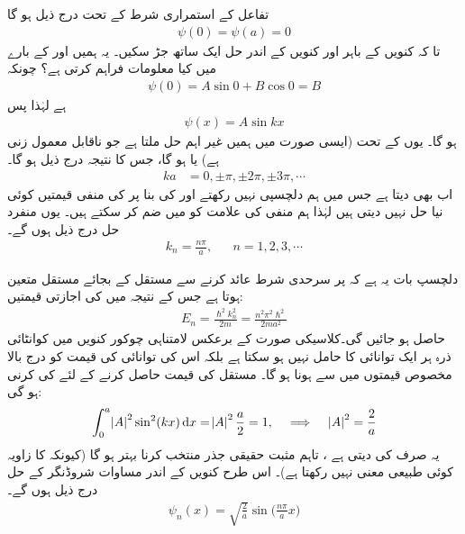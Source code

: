 تفاعل  کے استمراری شرط کے تحت  درج ذیل ہو گا
\begin{align}
\psi(0)=\psi(a)=0
\end{align} 
تا کہ کنویں کے باہر اور کنویں کے اندر حل ایک  ساتھ جڑ سکیں۔ یہ ہمیں اور کے بارے میں کیا معلومات فراہم کرتی ہے؟ چونکہ
\begin{align*}
\psi(0)=A\sin 0+B\cos 0=B
\end{align*}
ہے لہٰذا   پس
\begin{align}
\psi(x)=A\sin kx
\end{align}
ہو گا۔ یوں  کے تحت     (ایسی صورت میں ہمیں غیر اہم حل  ملتا ہے جو ناقابل  معمول زنی  ہے) یا  ہو گا، جس کا نتیجہ   درج ذیل ہو گا۔
\begin{align}
ka&=0,\pm\pi,\pm2\pi,\pm3\pi,\cdots
\end{align} 
اب  بھی  دیتا ہے جس  میں ہم دلچسپی نہیں رکھتے اور  کی بنا پر  کی منفی قیمتیں کوئی نیا حل نہیں دیتی ہیں لہٰذا ہم منفی کی علامت کو  میں ضم کر سکتے ہیں۔ یوں منفرد حل درج ذیل ہوں گے۔ 
\begin{align}
k_{n}=\frac{n\pi}{a},&& n=1,2,3,\cdots
\end{align}

دلچسپ بات یہ ہے کہ  پر سرحدی شرط عائد کرنے سے  مستقل  کے بجائے مستقل متعین ہوتا ہے جس کے نتیجہ میں    کی اجازتی قیمتیں:
\begin{align}\label{مساوات_شروڈنگر_لامتناہی_چکور_کنواں_توانائیاں}
E_{n}=\frac{\hslash^2 k^{2}_{n}}{2m}=\frac{n^{2}\pi^{2}\hslash^{2}}{2ma^{2}}
\end{align} 
حاصل ہو جائیں گی۔کلاسیکی صورت کے برعکس لامتناہی چوکور کنویں میں کوانٹائی ذرہ ہر ایک توانائی کا حامل نہیں ہو سکتا ہے بلکہ اس کی توانائی کی قیمت کو درج بالا مخصوص  قیمتوں میں سے ہونا ہو گا۔ مستقل  کی قیمت حاصل کرنے کے لئے کی   کرنی ہو گی: 
\begin{align*}
\int_{0}^{a}\abs{A}^{2}\sin^{2}(kx)\dif{x}=\abs{A}^{2}\frac{a}{2}=1,\quad \implies\quad \abs{A}^{2}=\frac{2}{a}
\end{align*} 
یہ صرف   کی    دیتی ہے ، تاہم مثبت حقیقی جذر  منتخب کرنا بہتر ہو گا (کیونکہ  کا زاویہ کوئی طبیعی معنی نہیں رکھتا ہے)۔ اس طرح کنویں کے اندر مساوات شروڈنگر کے حل درج ذیل ہوں گے۔
\begin{align}\label{مساوات_شروڈنگر_میری_سائے}
\psi_{n}(x)=\sqrt{\frac{2}{a}}\sin\big(\frac{n\pi}{a}x\big)
\end{align}

